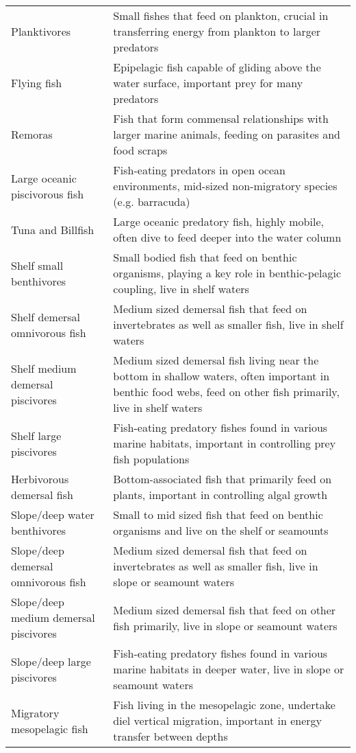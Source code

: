 \begin{longtable}{p{}p{}}
Planktivores & Small fishes that feed on plankton, crucial in transferring energy from plankton to larger predators \\
Flying fish & Epipelagic fish capable of gliding above the water surface, important prey for many predators \\
Remoras & Fish that form commensal relationships with larger marine animals, feeding on parasites and food scraps \\
Large oceanic piscivorous fish & Fish-eating predators in open ocean environments, mid-sized non-migratory species (e.g. barracuda) \\
Tuna and Billfish & Large oceanic predatory fish, highly mobile, often dive to feed deeper into the water column \\
Shelf small benthivores & Small bodied fish that feed on benthic organisms, playing a key role in benthic-pelagic coupling, live in shelf waters \\
Shelf demersal omnivorous fish & Medium sized demersal fish that feed on invertebrates as well as smaller fish, live in shelf waters \\
Shelf medium demersal piscivores & Medium sized demersal fish living near the bottom in shallow waters, often important in benthic food webs, feed on other fish primarily, live in shelf waters \\
Shelf large piscivores & Fish-eating predatory fishes found in various marine habitats, important in controlling prey fish populations \\
Herbivorous demersal fish & Bottom-associated fish that primarily feed on plants, important in controlling algal growth \\
Slope/deep water benthivores & Small to mid sized fish that feed on benthic organisms and live on the shelf or seamounts \\
Slope/deep demersal omnivorous fish & Medium sized demersal fish that feed on invertebrates as well as smaller fish, live in slope or seamount waters \\
Slope/deep medium demersal piscivores & Medium sized demersal fish that feed on other fish primarily, live in slope or seamount waters \\
Slope/deep large piscivores & Fish-eating predatory fishes found in various marine habitats in deeper water, live in slope or seamount waters \\
Migratory mesopelagic fish & Fish living in the mesopelagic zone, undertake diel vertical migration, important in energy transfer between depths \\

\end{longtable}
